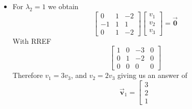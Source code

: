 \documentclass[12pt, landscape, twocolumn]{article}
\let\oldvec\vec
\renewcommand{\vec}[1]{\oldvec{\mathbf{ #1 } } }                    %
\begin{document}
\begin{enumerate}
\begin{itemize}
\[\begin{array}{rrr|r}
                                0 & 1 & -3 & 0\\
                                0 & 0 & 0 & 0
                            \end{array} \right]
                        \]
                        Therefore $v_1 = v_3$, and $v_2 = 3 v_3$ giving us an answer of
                        \[
                            \boxed{
                                \vec{v}_1 =
                                \left[ \begin{array}{r}
                                    1\\ 3\\ 1
                                \end{array} \right]
                                \to \lambda_1 = 2
                            }
                        \]
                    \item For $\lambda_2 = 1$ we obtain
                        \[
                            \left[ \begin{array}{rrr}
                                0 & 1 & -2\\
                                -1 & 1 & 1\\
                                0 & 1 & -2
                            \end{array} \right]
                            \left[ \begin{array}{r}
                                v_1\\ v_2\\ v_3
                            \end{array} \right]
                            = \vec{0}
                        \]
                        With RREF
                        \[
                            \left[ \begin{array}{rrr|r}
                                1 & 0 & -3 & 0\\
                                0 & 1 & -2 & 0\\
                                0 & 0 & 0 & 0
                            \end{array} \right]
                        \]
                        Therefore $v_1 = 3v_3$, and $v_2 = 2 v_3$ giving us an answer of
                        \[
                            \boxed{
                                \vec{v}_1 =
                                \left[ \begin{array}{r}
                                    3\\ 2\\ 1

\end{array}}\]
\end{itemize}
\end{enumerate}
\end{document}
